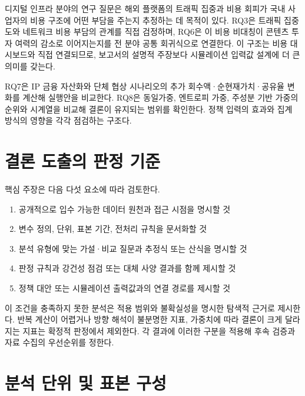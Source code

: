 \documentclass[11pt,a4paper]{report}
\begin{document}
디지털 인프라 분야의 연구 질문은 해외 플랫폼의 트래픽 집중과 비용 회피가 국내 사업자의 비용 구조에 어떤 부담을 주는지 추정하는 데 목적이 있다. RQ3은 트래픽 집중도와 네트워크 비용 부담의 관계를 직접 검정하며, RQ6은 이 비용 비대칭이 콘텐츠 투자 여력의 감소로 이어지는지를 전 분야 공통 회귀식으로 연결한다. 이 구조는 비용 대시보드와 직접 연결되므로, 보고서의 설명적 주장보다 시뮬레이션 입력값 설계에 더 큰 의미를 갖는다.

RQ7은 IP 금융 자산화와 단체 협상 시나리오의 추가 회수액·순현재가치·공유율 변화를 계산해 실행안을 비교한다. RQ8은 동일가중, 엔트로피 가중, 주성분 기반 가중의 순위와 시계열을 비교해 결론이 유지되는 범위를 확인한다. 정책 입력의 효과와 집계 방식의 영향을 각각 점검하는 구조다.

\section{결론 도출의 판정 기준}
핵심 주장은 다음 다섯 요소에 따라 검토한다.
\begin{enumerate}[label=\arabic*.]
  \item 공개적으로 입수 가능한 데이터 원천과 접근 시점을 명시할 것
  \item 변수 정의, 단위, 표본 기간, 전처리 규칙을 문서화할 것
  \item 분석 유형에 맞는 가설·비교 질문과 추정식 또는 산식을 명시할 것
  \item 판정 규칙과 강건성 점검 또는 대체 사양 결과를 함께 제시할 것
  \item 정책 대안 또는 시뮬레이션 출력값과의 연결 경로를 제시할 것
\end{enumerate}

이 조건을 충족하지 못한 분석은 적용 범위와 불확실성을 명시한 탐색적 근거로 제시한다. 반복 계산이 어렵거나 방향 해석이 불분명한 지표, 가중치에 따라 결론이 크게 달라지는 지표는 확정적 판정에서 제외한다. 각 결과에 이러한 구분을 적용해 후속 검증과 자료 수집의 우선순위를 정한다.

\section{분석 단위 및 표본 구성}
\end{document}
